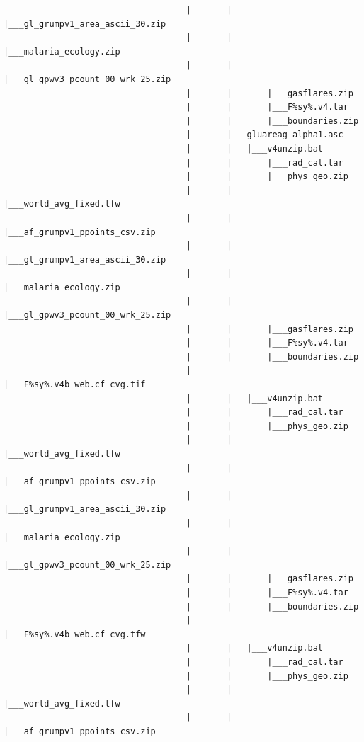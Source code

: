 \documentclass[
]{book}
\begin{document}
\begin{verbatim}
                                    |       |       |___gl_grumpv1_area_ascii_30.zip
                                    |       |       |___malaria_ecology.zip
                                    |       |       |___gl_gpwv3_pcount_00_wrk_25.zip
                                    |       |       |___gasflares.zip
                                    |       |       |___F%sy%.v4.tar
                                    |       |       |___boundaries.zip
                                    |       |___gluareag_alpha1.asc
                                    |       |   |___v4unzip.bat
                                    |       |       |___rad_cal.tar
                                    |       |       |___phys_geo.zip
                                    |       |       |___world_avg_fixed.tfw
                                    |       |       |___af_grumpv1_ppoints_csv.zip
                                    |       |       |___gl_grumpv1_area_ascii_30.zip
                                    |       |       |___malaria_ecology.zip
                                    |       |       |___gl_gpwv3_pcount_00_wrk_25.zip
                                    |       |       |___gasflares.zip
                                    |       |       |___F%sy%.v4.tar
                                    |       |       |___boundaries.zip
                                    |       |___F%sy%.v4b_web.cf_cvg.tif
                                    |       |   |___v4unzip.bat
                                    |       |       |___rad_cal.tar
                                    |       |       |___phys_geo.zip
                                    |       |       |___world_avg_fixed.tfw
                                    |       |       |___af_grumpv1_ppoints_csv.zip
                                    |       |       |___gl_grumpv1_area_ascii_30.zip
                                    |       |       |___malaria_ecology.zip
                                    |       |       |___gl_gpwv3_pcount_00_wrk_25.zip
                                    |       |       |___gasflares.zip
                                    |       |       |___F%sy%.v4.tar
                                    |       |       |___boundaries.zip
                                    |       |___F%sy%.v4b_web.cf_cvg.tfw
                                    |       |   |___v4unzip.bat
                                    |       |       |___rad_cal.tar
                                    |       |       |___phys_geo.zip
                                    |       |       |___world_avg_fixed.tfw
                                    |       |       |___af_grumpv1_ppoints_csv.zip

\end{verbatim}
\end{document}
